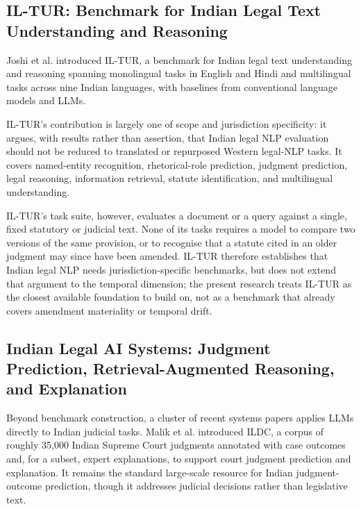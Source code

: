 \subsection{IL-TUR: Benchmark for Indian Legal Text Understanding and Reasoning}

\label{sec:2-3-2}

Joshi et al. \cite{joshi2024iltur} introduced IL-TUR, a benchmark for Indian legal text understanding and reasoning spanning monolingual tasks in English and Hindi and multilingual tasks across nine Indian languages, with baselines from conventional language models and LLMs.

IL-TUR's contribution is largely one of scope and jurisdiction specificity: it argues, with results rather than assertion, that Indian legal NLP evaluation should not be reduced to translated or repurposed Western legal-NLP tasks. It covers named-entity recognition, rhetorical-role prediction, judgment prediction, legal reasoning, information retrieval, statute identification, and multilingual understanding.

IL-TUR's task suite, however, evaluates a document or a query against a single, fixed statutory or judicial text. None of its tasks requires a model to compare two versions of the same provision, or to recognise that a statute cited in an older judgment may since have been amended. IL-TUR therefore establishes that Indian legal NLP needs jurisdiction-specific benchmarks, but does not extend that argument to the temporal dimension; the present research treats IL-TUR as the closest available foundation to build on, not as a benchmark that already covers amendment materiality or temporal drift.

\subsection{Indian Legal AI Systems: Judgment Prediction, Retrieval-Augmented Reasoning, and Explanation}

\label{sec:2-3-3}

Beyond benchmark construction, a cluster of recent systems papers applies LLMs directly to Indian judicial tasks. Malik et al. \cite{malik2021ildc} introduced ILDC, a corpus of roughly 35,000 Indian Supreme Court judgments annotated with case outcomes and, for a subset, expert explanations, to support court judgment prediction and explanation. It remains the standard large-scale resource for Indian judgment-outcome prediction, though it addresses judicial decisions rather than legislative text.


